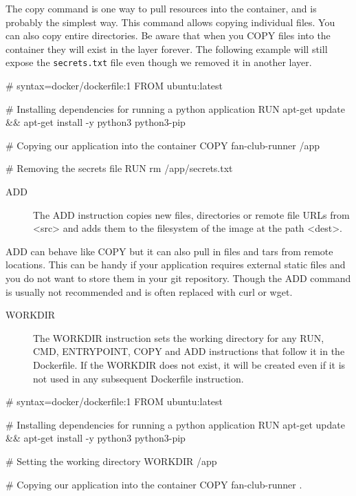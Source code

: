 \documentclass{csse4400}
\begin{document}
The copy command is one way to pull resources into the container, and is probably the simplest way. This command allows copying individual files. You can also copy entire directories. Be aware that when you COPY files into the container they will exist in the layer forever. The following example will still expose the \texttt{secrets.txt} file even though we removed it in another layer.

\begin{code}[language=docker,numbers=none]{}
  # syntax=docker/dockerfile:1
  FROM ubuntu:latest

  # Installing dependencies for running a python application
  RUN apt-get update && apt-get install -y python3 python3-pip

  # Copying our application into the container
  COPY fan-club-runner /app

  # Removing the secrets file
  RUN rm /app/secrets.txt
\end{code}

\begin{description}
  \item[ADD] The ADD instruction copies new files, directories or remote file URLs from <src> and adds them to the filesystem of the image at the path <dest>. \cite{Dockerfile}
\end{description}

ADD can behave like COPY but it can also pull in files and tars from remote locations. This can be handy if your application requires external static files and you do not want to store them in your git repository. Though the ADD command is usually not recommended and is often replaced with curl or wget.

\begin{description}
  \item[WORKDIR] The WORKDIR instruction sets the working directory for any RUN, CMD, ENTRYPOINT, COPY and ADD instructions that follow it in the Dockerfile. If the WORKDIR does not exist, it will be created even if it is not used in any subsequent Dockerfile instruction. \cite{Dockerfile}
\end{description}

\begin{code}[language=docker,numbers=none]{}
  # syntax=docker/dockerfile:1
  FROM ubuntu:latest

  # Installing dependencies for running a python application
  RUN apt-get update && apt-get install -y python3 python3-pip

  # Setting the working directory
  WORKDIR /app

  # Copying our application into the container
  COPY fan-club-runner .
\end{code}
\end{document}
